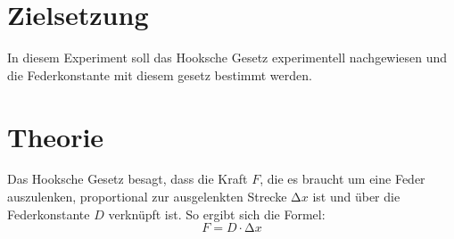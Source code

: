 %

%
\section{Zielsetzung}
\label{sec:Theorie}
In diesem Experiment soll das Hooksche Gesetz experimentell nachgewiesen und die Federkonstante mit diesem gesetz bestimmt 
werden.

\section{Theorie}
Das Hooksche Gesetz besagt, dass die Kraft $F$, die es braucht um eine Feder auszulenken, proportional zur ausgelenkten 
Strecke $\increment x$ ist und über die Federkonstante $D$ verknüpft ist.
So ergibt sich die Formel:
\begin{equation}
    F = D \cdot \increment x
    \label{eq:Hook}
\end{equation}


%